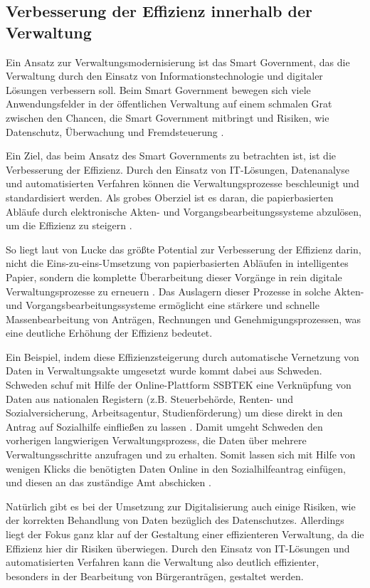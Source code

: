 \subsection{Verbesserung der Effizienz innerhalb der Verwaltung}\label{SGEffizienz}
Ein Ansatz zur Verwaltungsmodernisierung ist das Smart Government, das die Verwaltung durch den Einsatz von Informationstechnologie und digitaler Lösungen verbessern soll.
Beim Smart Government bewegen sich viele Anwendungsfelder in der öffentlichen Verwaltung auf einem schmalen Grat zwischen den Chancen, die Smart Government mitbringt und Risiken, wie Datenschutz, Überwachung und Fremdsteuerung \citep[Vgl.][]{Lucke2018}.
\par
Ein Ziel, das beim Ansatz des Smart Governments zu betrachten ist, ist die Verbesserung der Effizienz.
Durch den Einsatz von IT-Lösungen, Datenanalyse und automatisierten Verfahren können die Verwaltungsprozesse beschleunigt und standardisiert werden. 
Als grobes Oberziel ist es daran, die papierbasierten Abläufe durch elektronische Akten- und Vorgangsbearbeitungssysteme abzulösen, um die Effizienz zu steigern \citep[][]{von_Lucke_2016}.
\par
So liegt laut von Lucke das größte Potential zur Verbesserung der Effizienz darin, nicht die Eins-zu-eins-Umsetzung von papierbasierten Abläufen in intelligentes Papier, sondern die komplette Überarbeitung dieser Vorgänge in rein digitale Verwaltungsprozesse zu erneuern \citep[][S.179]{von_Lucke_2016}.
Das Auslagern dieser Prozesse in solche Akten- und Vorgangsbearbeitungssysteme ermöglicht eine stärkere und schnelle Massenbearbeitung von Anträgen, Rechnungen und Genehmigungsprozessen, was eine deutliche Erhöhung der Effizienz bedeutet.
\par
Ein Beispiel, indem diese Effizienzsteigerung durch automatische Vernetzung von Daten in Verwaltungsakte umgesetzt wurde kommt dabei aus Schweden.
Schweden schuf mit Hilfe der Online-Plattform SSBTEK eine Verknüpfung von Daten aus nationalen Registern (z.B. Steuerbehörde, Renten- und Sozialversicherung, Arbeitsagentur, Studienförderung) um diese direkt in den Antrag auf Sozialhilfe einfließen zu lassen \citep[][]{bitkom2023}.
Damit umgeht Schweden den vorherigen langwierigen Verwaltungsprozess, die Daten über mehrere Verwaltungsschritte anzufragen und zu erhalten.
Somit lassen sich mit Hilfe von wenigen Klicks die benötigten Daten Online in den Sozialhilfeantrag einfügen, und diesen an das zuständige Amt abschicken \citep[][]{NationalenNormenkontrollrat2017}.
\par
Natürlich gibt es bei der Umsetzung zur Digitalisierung auch einige Risiken, wie der korrekten Behandlung von Daten bezüglich des Datenschutzes.
Allerdings liegt der Fokus ganz klar auf der Gestaltung einer effizienteren Verwaltung, da die Effizienz hier dir Risiken überwiegen.
Durch den Einsatz von IT-Lösungen und automatisierten Verfahren kann die Verwaltung also deutlich effizienter, besonders in der Bearbeitung von Bürgeranträgen, gestaltet werden.
